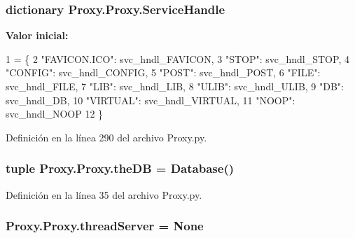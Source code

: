 \hypertarget{class_proxy_1_1_proxy_a3d8cb3aac8f5187e97d2b09e71d1d834}{
\subsubsection[{Service\-Handle}]{\setlength{\rightskip}{0pt plus 5cm}dictionary Proxy.\-Proxy.\-Service\-Handle\hspace{0.3cm}{\ttfamily [static]}}}\label{class_proxy_1_1_proxy_a3d8cb3aac8f5187e97d2b09e71d1d834}
{\bfseries Valor inicial\-:}
\begin{DoxyCode}
1 = \{
2         \textcolor{stringliteral}{"FAVICON.ICO"}: svc\_hndl\_FAVICON,
3         \textcolor{stringliteral}{"STOP"}: svc\_hndl\_STOP,
4         \textcolor{stringliteral}{"CONFIG"}: svc\_hndl\_CONFIG,
5         \textcolor{stringliteral}{"POST"}: svc\_hndl\_POST,
6         \textcolor{stringliteral}{"FILE"}: svc\_hndl\_FILE,
7         \textcolor{stringliteral}{"LIB"}: svc\_hndl\_LIB,
8         \textcolor{stringliteral}{"ULIB"}: svc\_hndl\_ULIB,
9         \textcolor{stringliteral}{"DB"}: svc\_hndl\_DB,
10         \textcolor{stringliteral}{"VIRTUAL"}: svc\_hndl\_VIRTUAL,
11         \textcolor{stringliteral}{"NOOP"}: svc\_hndl\_NOOP
12     \}
\end{DoxyCode}


Definición en la línea 290 del archivo Proxy.\-py.

\hypertarget{class_proxy_1_1_proxy_a19dcf84349392c1c43473fe836593307}{
\subsubsection[{the\-D\-B}]{\setlength{\rightskip}{0pt plus 5cm}tuple Proxy.\-Proxy.\-the\-D\-B = {\bf Database}()\hspace{0.3cm}{\ttfamily [static]}}}\label{class_proxy_1_1_proxy_a19dcf84349392c1c43473fe836593307}


Definición en la línea 35 del archivo Proxy.\-py.

\hypertarget{class_proxy_1_1_proxy_abeccfa250f08858f279dfba710a600c4}{
\subsubsection[{thread\-Server}]{\setlength{\rightskip}{0pt plus 5cm}Proxy.\-Proxy.\-thread\-Server = None\hspace{0.3cm}{\ttfamily [static]}}}\label{class_proxy_1_1_proxy_abeccfa250f08858f279dfba710a600c4}


